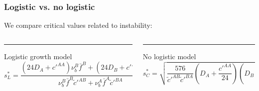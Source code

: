 \documentclass[10pt]{beamer}
\newcommand\eps{\varepsilon}
\def \a {{\alpha}}
\def \b {{\beta}}
\def \g {{\gamma}}
\def \d {{\delta}}
\def \bfA {{\bar{f}^A}}
\theoremstyle{remark}
\newcommand\Fontv{\fontsize{7}{7.2}\selectfont}
\begin{document}
\begin{frame}
\frametitle{Logistic vs. no logistic}
We compare critical values related to instability:

\Fontv
\begin{columns}[T] %
	\begin{column}{.50\textwidth}
		\color{blue}\rule{\linewidth}{2pt}
		Logistic growth model
		$$s_{L}^{*}=\frac{(24 D_A+c'^{AA})\nu_{b}^{B}\bar{f}^{B}+(24 D_B+c'^{BB})\nu_{b}^{A}\bar{f}^A}{\nu_{b}^{B}\bar{f}^B\tilde{c}'^{AB}+\nu_{b}^{A}\bar{f}^A\tilde{c}'^{BA}}, $$
	

		
	\end{column}%
	\hfill%
	\begin{column}{.50\textwidth}
		\color{blue}\rule{\linewidth}{2pt}
		No logistic model
		$$ s^{*}_{C}= \sqrt{\frac{576}{\tilde{c}'^{AB} \tilde{c}'^{BA}} \left( D_A+\frac{c'^{AA}}{24} \right) \left(D_B+\frac{c'^{BB}}{24} \right) } $$
		
		
	\end{column}%
\end{columns}

%	






\begin{figure}


\end{figure}
\end{frame}
\end{document}

